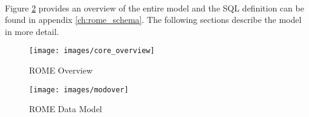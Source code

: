 
\paragraph{}
Figure \ref{fig:modover} provides an overview of the entire model and the SQL definition can be found in appendix \ref{ch:rome_schema}. The following sections describe the model in more detail.


\begin{figure}
\centering
\caption{ROME Overview}\label{fig:modover}
\texttt{[image: images/core\_overview]}
\end{figure}

\begin{figure}
\centering
\caption{ROME Data Model}\label{fig:modover}
\texttt{[image: images/modover]}
\end{figure}

\clearpage
